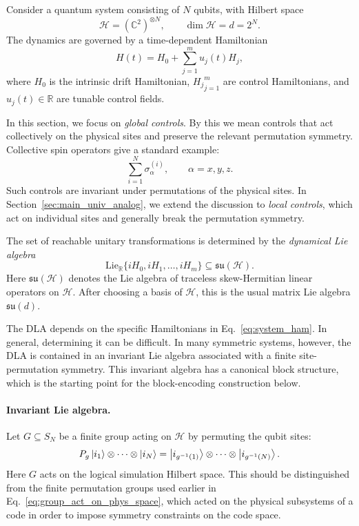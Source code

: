 \documentclass[10pt,twocolumn,superscriptaddress,aps,amsmath,amssymb,citeautoscript,floatfix,prx,longbibliography]{revtex4-2}
\newcounter{alg}
\theoremstyle{plain}
\theoremstyle{plain}
\theoremstyle{plain}
\theoremstyle{plain}
\theoremstyle{plain}
\theoremstyle{plain}
\begin{document}
Consider a quantum system consisting of $N$ qubits, with Hilbert space
$$
\mathcal H=(\mathbb C^2)^{\otimes N},
\qquad
\dim\mathcal H=d=2^N .
$$
The dynamics are governed by a time-dependent Hamiltonian
\begin{equation}\label{eq:system_ham}
H(t)
=
H_0
+
\sum_{j=1}^m u_j(t)H_j,
\end{equation}
where $H_0$ is the intrinsic drift Hamiltonian, ${H_j}_{j=1}^m$ are control Hamiltonians, and $u_j(t)\in\mathbb R$ are tunable control fields.

In this section, we focus on \textit{global controls}. By this we mean controls that act collectively on the physical sites and preserve the relevant permutation symmetry. Collective spin operators give a standard example:
$$
\sum_{i=1}^N \sigma_\alpha^{(i)},
\qquad
\alpha=x,y,z .
$$
Such controls are invariant under permutations of the physical sites. In Section~\ref{sec:main_univ_analog}, we extend the discussion to \textit{local controls}, which act on individual sites and generally break the permutation symmetry.

The set of reachable unitary transformations is determined by the \textit{dynamical Lie algebra}~\cite{DAlessandro2021, Albertini2003}
$$
\mathrm{Lie}_{\mathbb R}
\{iH_0,iH_1,\ldots,iH_m\}
\subseteq
\mathfrak{su}(\mathcal H).
$$
Here $\mathfrak{su}(\mathcal H)$ denotes the Lie algebra of traceless skew-Hermitian linear operators on $\mathcal H$. After choosing a basis of $\mathcal H$, this is the usual matrix Lie algebra $\mathfrak{su}(d)$.

The DLA depends on the specific Hamiltonians in Eq.~\eqref{eq:system_ham}. In general, determining it can be difficult. In many symmetric systems, however, the DLA is contained in an invariant Lie algebra associated with a finite site-permutation symmetry. This invariant algebra has a canonical block structure, which is the starting point for the block-encoding construction below.

\paragraph{Invariant Lie algebra.}

Let $G\subseteq S_N$ be a finite group acting on $\mathcal H$ by permuting the qubit sites:
$$
P_g
\ket{i_1}\otimes\cdots\otimes\ket{i_N}
=
\ket{i_{g^{-1}(1)}}\otimes\cdots\otimes\ket{i_{g^{-1}(N)}} .
$$
Here $G$ acts on the logical simulation Hilbert space. This should be distinguished from the finite permutation groups used earlier in Eq.~\eqref{eq:group_act_on_phys_space}, which acted on the physical subsystems of a code in order to impose symmetry constraints on the code space.
\end{document}
